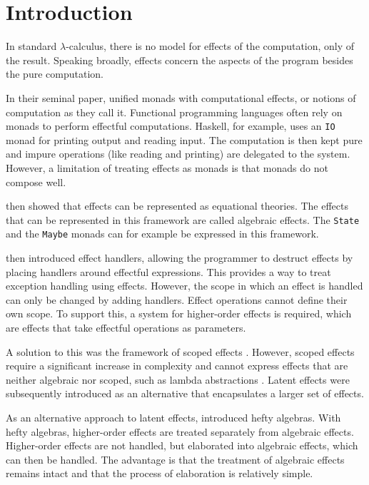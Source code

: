 \chapter{Introduction}

In standard $\lambda$-calculus, there is no model for effects of the computation, only of the result. Speaking broadly, effects concern the aspects of the program besides the pure computation. \cite{moggi_computational_1989}

In their seminal paper, \textcite{moggi_computational_1989} unified monads with computational effects, or notions of computation as they call it. Functional programming languages often rely on monads to perform effectful computations. Haskell, for example, uses an \texttt{IO} monad for printing output and reading input. The computation is then kept pure and impure operations (like reading and printing) are delegated to the system. However, a limitation of treating effects as monads is that monads do not compose well.

\textcite{goos_adequacy_2001} then showed that effects can be represented as equational theories. The effects that can be represented in this framework are called algebraic effects. The \texttt{State} and the \texttt{Maybe} monads can for example be expressed in this framework.

\textcite{castagna_handlers_2009} then introduced effect handlers, allowing the programmer to destruct effects by placing handlers around effectful expressions. This provides a way to treat exception handling using effects. However, the scope in which an effect is handled can only be changed by adding handlers. Effect operations cannot define their own scope. To support this, a system for higher-order effects is required, which are effects that take effectful operations as parameters.

A solution to this was the framework of scoped effects \cite{wu_effect_2014}. However, scoped effects require a significant increase in complexity and cannot express effects that are neither algebraic nor scoped, such as lambda abstractions \cite{oh_latent_2021}. Latent effects \cite{oh_latent_2021} were subsequently introduced as an alternative that encapsulates a larger set of effects.

As an alternative approach to latent effects, \textcite{bach_poulsen_hefty_2023} introduced hefty algebras. With hefty algebras, higher-order effects are treated separately from algebraic effects. Higher-order effects are not handled, but elaborated into algebraic effects, which can then be handled. The advantage is that the treatment of algebraic effects remains intact and that the process of elaboration is relatively simple.

